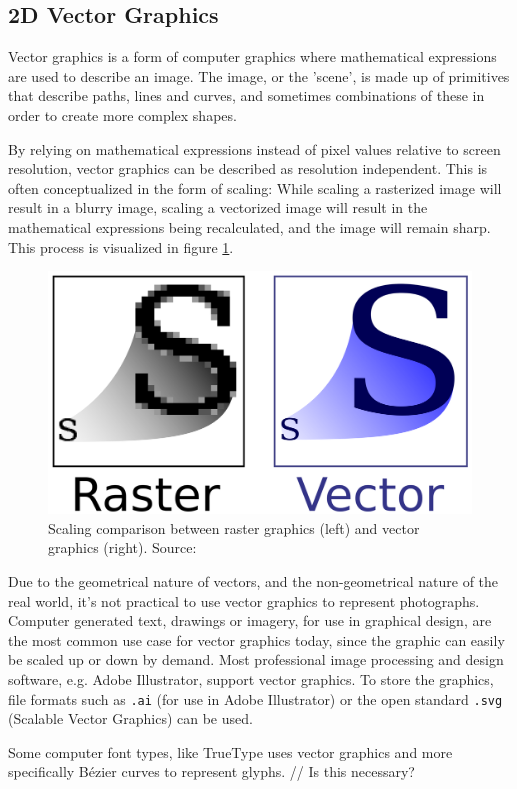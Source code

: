 \subsection{2D Vector Graphics}
Vector graphics is a form of computer graphics where mathematical expressions are used to describe an image. 
The image, or the 'scene', is made up of primitives that describe paths, lines and curves, and sometimes combinations of these in order to create more complex shapes.

By relying on mathematical expressions instead of pixel values relative to screen resolution, vector graphics can be described as resolution independent. 
This is often conceptualized in the form of scaling: While scaling a rasterized image will result in a blurry image, scaling a vectorized image will result in the mathematical expressions being recalculated, and the image will remain sharp. 
This process is visualized in figure \ref{fig:vectorscaling}.

\begin{figure}[h!]
\centering \includegraphics[width=0.5\linewidth]{images/bm_vs_svg.png}
\caption{Scaling comparison between raster graphics (left) and vector graphics (right). Source: \cite{svg}}
\label{fig:vectorscaling}
\end{figure}

Due to the geometrical nature of vectors, and the non-geometrical nature of the real world, it's not practical to use vector graphics to represent photographs. 
Computer generated text, drawings or imagery, for use in graphical design, are the most common use case for vector graphics today, since the graphic can easily be scaled up or down by demand. 
Most professional image processing and design software, e.g. Adobe Illustrator, support vector graphics. 
To store the graphics, file formats such as \texttt{.ai} (for use in Adobe Illustrator) or the open standard \texttt{.svg} (Scalable Vector Graphics) can be used.


Some computer font types, like TrueType uses vector graphics and more specifically Bézier curves to represent glyphs\cite{truetype}. // Is this necessary?